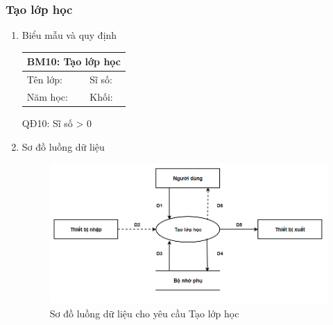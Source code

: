 \documentclass[a4paper]{article}
\begin{document}
					\subsubsection{Tạo lớp học}	
					\begin{enumerate}
\item Biểu mẫu và quy định

\begin{table}[H]
\centering
\renewcommand{\arraystretch}{1.5}
\setlength{\tabcolsep}{15pt}
\begin{tabular}{|p{5cm}|p{5cm}|}
\hline
\multicolumn{2}{|c|}{\textbf{BM10: Tạo lớp học}} \\  
\hline
Tên lớp: \dotfill  & Sĩ số: \dotfill \\
\hline
Năm học: \dotfill & Khối: \dotfill \\
\hline
\end{tabular}
\end{table}

QĐ10: Sĩ số > 0

\item Sơ đồ luồng dữ liệu
\begin{figure}[H] 
    \centering
    \includegraphics[width=1\textwidth]{dfd10} %
    \caption{Sơ đồ luồng dữ liệu cho yêu cầu Tạo lớp học}
\end{figure}


\end{enumerate}
\end{document}
